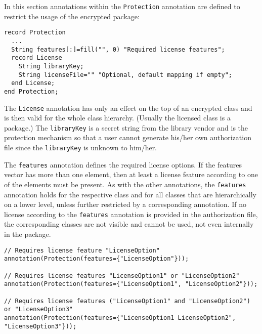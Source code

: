 In this section annotations within the \lstinline!Protection! annotation are
defined to restrict the usage of the encrypted package:
\begin{lstlisting}[language=modelica]
record Protection
  ...
  String features[:]=fill("", 0) "Required license features";
  record License
    String libraryKey;
    String licenseFile="" "Optional, default mapping if empty";
  end License;
end Protection;
\end{lstlisting}
The \lstinline!License! annotation has only an effect on the top of an encrypted
class and is then valid for the whole class hierarchy. (Usually
the licensed class is a package.) The \lstinline!libraryKey! is a secret string
from the library vendor and is the protection mechanism so that a user
cannot generate his/her own authorization file since the \lstinline!libraryKey! is
unknown to him/her.

The \lstinline!features! annotation defines the required license options. If the
features vector has more than one element, then at least a license
feature according to one of the elements must be present. As with the
other annotations, the \lstinline!features! annotation holds for the respective
class and for all classes that are hierarchically on a lower level,
unless further restricted by a corresponding annotation. If no license
according to the \lstinline!features! annotation is provided in the
authorization file, the corresponding classes are not visible and cannot
be used, not even internally in the package.

\begin{example}
\begin{lstlisting}[language=modelica]
// Requires license feature "LicenseOption"
annotation(Protection(features={"LicenseOption"}));

// Requires license features "LicenseOption1" or "LicenseOption2"
annotation(Protection(features={"LicenseOption1", "LicenseOption2"}));

// Requires license features ("LicenseOption1" and "LicenseOption2") or "LicenseOption3"
annotation(Protection(features={"LicenseOption1 LicenseOption2", "LicenseOption3"}));
\end{lstlisting}
\end{example}

